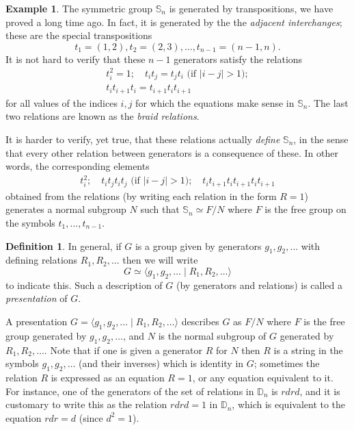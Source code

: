 \documentclass[11pt,oneside]{article}
\theoremstyle{definition}
\newtheorem{defn}[thm]{Definition}
\newtheorem{example}[thm]{Example}
\newcommand{\gen}[1]{\langle #1 \rangle}
\newcommand{\Sym}{\mathbb{S}}
\newcommand{\D}{\mathbb{D}}
\begin{document}
\begin{example}
The symmetric group $\Sym_n$ is generated by transpositions, we have
proved a long time ago. In fact, it is generated by the the
\emph{adjacent interchanges}; these are the special transpositions
\[
  t_1=(1,2), t_2=(2,3), \dots, t_{n-1} = (n-1,n).
\]
It is not hard to verify that these $n-1$ generators satisfy the
relations
\begin{gather*}
 t_i^2 = 1; \quad t_it_j=t_jt_i \text{ (if $|i-j|>1$)};
 \\ t_it_{i+1}t_i = t_{i+1}t_it_{i+1}
\end{gather*}
for all values of the indices $i,j$ for which the equations make sense
in $\Sym_n$. The last two relations are known as the \emph{braid
  relations}.

It is harder to verify, yet true, that these relations actually {\em
  define} $\Sym_n$, in the sense that every other relation between
generators is a consequence of these. In other words, the
corresponding elements
\begin{gather*}
  t_i^2; \quad t_it_jt_it_j \text{ (if $|i-j|>1$)}; \quad
  t_it_{i+1}t_it_{i+1}t_it_{i+1}
\end{gather*}
obtained from the relations (by writing each relation in the form $R =
1$) generates a normal subgroup $N$ such that $\Sym_n \simeq F/N$
where $F$ is the free group on the symbols $t_1, \dots, t_{n-1}$.
\end{example}



\begin{defn}
In general, if $G$ is a group given by generators $g_1, g_2, \dots$
with defining relations $R_1, R_2, \dots$ then we will write
\[
 G \simeq \gen{g_1, g_2, \dots \mid R_1, R_2, \dots} 
\]
to indicate this.  Such a description of $G$ (by generators and
relations) is called a {\em presentation} of $G$.
\end{defn}

A presentation $G = \gen{g_1, g_2, \dots \mid R_1, R_2, \dots}$
describes $G$ as $F/N$ where $F$ is the free group generated by $g_1,
g_2, \dots$, and $N$ is the normal subgroup of $G$ generated by $R_1,
R_2, \dots$. Note that if one is given a generator $R$ for $N$ then
$R$ is a string in the symbols $g_1, g_2, \dots$ (and their inverses)
which is identity in $G$; sometimes the relation $R$ is expressed as
an equation $R = 1$, or any equation equivalent to it. For instance,
one of the generators of the set of relations in $\D_n$ is $rdrd$, and
it is customary to write this as the relation $rdrd=1$ in $\D_n$,
which is equivalent to the equation $rdr=d$ (since $d^2=1$).
\end{document}
